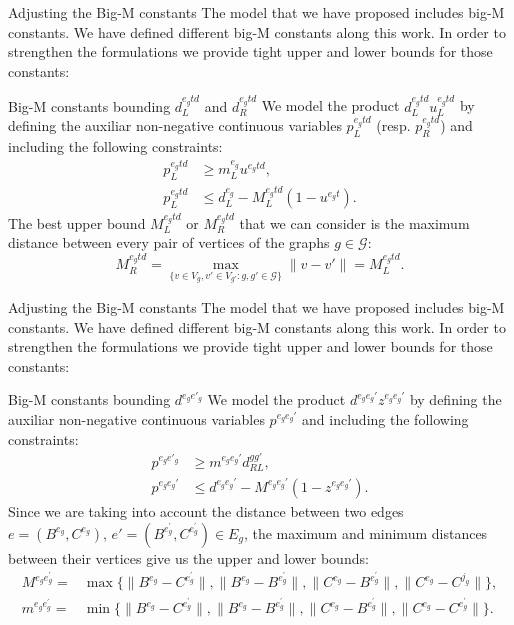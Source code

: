 \documentclass[slidestop,usepdftitle=false,10pt]{beamer}
\begin{document}
	\begin{frame}{Adjusting the Big-M constants}
    The model that we have proposed includes big-M constants. We have defined different big-M constants along this work. In order to strengthen the formulations we provide tight upper and lower bounds for those constants:
    
    \begin{block}{Big-M constants bounding $d_L^{e_gtd}$ and $d_R^{e_gtd}$}
    \small
        We model the product $d_L^{e_gtd} u_L^{e_gtd}$ by defining the auxiliar non-negative continuous variables $p_L^{e_gtd}$ (resp. $p_R^{e_gtd}$) and including the following constraints:
        \begin{align*}
        p_L^{e_gtd} & \geq m_L^{e_g} u^{e_gtd}, \\
        p_L^{e_gtd} & \leq d_L^{e_g} - M_L^{e_gtd}(1-u^{e_gt}).
        \end{align*}
        The best upper bound $M_L^{e_gtd}$ or $M_R^{e_gtd}$ that we can consider is the maximum distance between every pair of vertices of the graphs $g\in \mathcal{G}$:
        $$
        M_R^{e_gtd} = \max_{\{v\in V_g, v'\in V_{g'} : g, g'\in\mathcal G\}} \|v - v'\| = M_L^{e_gtd}.
        $$
    \end{block}
	\end{frame}
	
	\begin{frame}{Adjusting the Big-M constants}
    The model that we have proposed includes big-M constants. We have defined different big-M constants along this work. In order to strengthen the formulations we provide tight upper and lower bounds for those constants:
    
    \begin{block}{Big-M constants bounding $d^{e_ge'_g}$}
        \footnotesize
        We model the product $d^{e_ge_g'} z^{e_g e_g'}$ by defining the auxiliar non-negative continuous variables $p^{e_ge_g'}$ and including the following constraints:
        \begin{align*}
        p^{e_ge'_g} & \geq m^{e_ge_g'} d_{RL}^{gg'}, \\
        p^{e_ge_g'} & \leq d^{e_ge_g'} - M^{e_ge_g'}(1-z^{e_ge_g'}).
        \end{align*}
        Since we are taking into account the distance between two edges $e=(B^{e_g},C^{e_g}), \, e'=(B^{e^\prime_g},C^{e^\prime_g})\in E_g$, the maximum and minimum distances between their vertices give us the upper and lower bounds:
        \begin{align*}
        M^{e_g e^\prime_g} = & \max\{\|B^{e_g} - C^{e^\prime_g}\|, \|B^{e_g} - B^{e^\prime_g}\|, \|C^{e_g} - B^{e^\prime_g}\|, \|C^{e_g} - C^{j_g}\|\}, \\
        m^{e_g e^\prime_g} = & \min\{\|B^{e_g} - C^{e^\prime_g}\|, \|B^{e_g} - B^{e^\prime_g}\|, \|C^{e_g} - B^{e^\prime_g}\|, \|C^{e_g} - C^{e^\prime_g}\|\}.
        \end{align*}
    \end{block}
	\end{frame}
	
\end{document}
